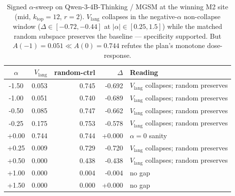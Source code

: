 \begin{table}[t]
\centering
\caption{Signed $\alpha$-sweep on Qwen-3-4B-Thinking / MGSM at the winning M2 site (mid, $k_{\text{top}}=12$, $r=2$). $V_{\mathrm{lang}}$ collapses in the negative-$\alpha$ non-collapse window ($\Delta \in [-0.72, -0.44]$ at $|\alpha| \in [0.25, 1.5]$) while the matched random subspace preserves the baseline --- specificity supported. But $A(-1)=0.051 \ll A(0)=0.744$ refutes the plan's monotone dose-response.}
\label{tab:c3_alpha_delta}
\begin{tabular}{crrrl}
\toprule
$\alpha$ & $V_{\mathrm{lang}}$ & random-ctrl & $\Delta$ & Reading \\
\midrule
-1.50 & 0.053 & 0.745 & -0.692 & $V_{\mathrm{lang}}$ collapses; random preserves \\
-1.00 & 0.051 & 0.740 & -0.689 & $V_{\mathrm{lang}}$ collapses; random preserves \\
-0.50 & 0.085 & 0.747 & -0.662 & $V_{\mathrm{lang}}$ collapses; random preserves \\
-0.25 & 0.175 & 0.753 & -0.578 & $V_{\mathrm{lang}}$ collapses; random preserves \\
+0.00 & 0.744 & 0.744 & +0.000 & $\alpha=0$ sanity \\
+0.25 & 0.009 & 0.729 & -0.720 & $V_{\mathrm{lang}}$ collapses; random preserves \\
+0.50 & 0.000 & 0.438 & -0.438 & $V_{\mathrm{lang}}$ collapses; random preserves \\
+1.00 & 0.000 & 0.004 & -0.004 & no gap \\
+1.50 & 0.000 & 0.000 & +0.000 & no gap \\
\bottomrule
\end{tabular}
\end{table}
